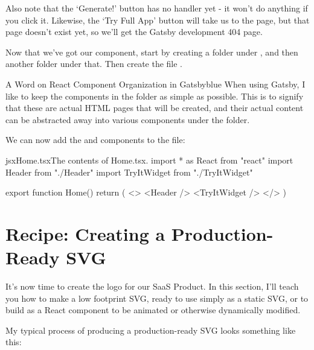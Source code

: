 \documentclass[paper=6in:9in,pagesize=pdftex,headinclude=on,footinclude=on,12pt,twoside]{scrbook}
\begin{document}
Also note that the `Generate!' button has no  handler yet - it won't do anything if you click it. Likewise, the `Try Full App' button will take us to the  page, but that page doesn't exist yet, so we'll get the Gatsby development 404 page.


Now that we've got our  component, start by creating a  folder under  , and then another folder  under that. Then create the file .

\begin{highlightBox}{A Word on React Component Organization in Gatsby}{blue}{\information}
When using Gatsby, I like to keep the components in the  folder as simple as possible. This is to signify that these are actual HTML pages that will be created, and their actual content can be abstracted away into various components under the  folder.
\end{highlightBox}

We can now add the  and  components to the   file:

\begin{codeInput}{jsx}{Home.tsx}{The contents of Home.tsx.}
import * as React from "react"
import { Header } from "./Header"
import { TryItWidget } from "./TryItWidget"

export function Home() {
  return (
    <>
      <Header />
      <TryItWidget />
    </>
  )
}  
\end{codeInput}

\section{Recipe: Creating a Production-Ready SVG}

It's now time to create the logo for our SaaS Product. In this section, I'll teach you how to make a low footprint SVG, ready to use simply as a static SVG, or to build as a React component to be animated or otherwise dynamically modified.

My typical process of producing a production-ready SVG looks something like this:
\end{document}
